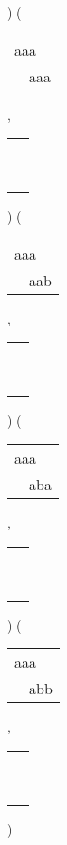 ) 
 ( 
\begin{tabular}{|l|} \hline
aaa\ \  \\
\ \ aaa \\
\hline
\end{tabular} 
 , 
\begin{tabular}{|l|} \hline
\ \\ \ \\ \hline
\end{tabular} 
) 
 ( 
\begin{tabular}{|l|} \hline
aaa\ \  \\
\ \ aab \\
\hline
\end{tabular} 
 , 
\begin{tabular}{|l|} \hline
\ \\ \ \\ \hline
\end{tabular} 
) 
 ( 
\begin{tabular}{|l|} \hline
aaa\ \  \\
\ \ aba \\
\hline
\end{tabular} 
 , 
\begin{tabular}{|l|} \hline
\ \\ \ \\ \hline
\end{tabular} 
) 
 ( 
\begin{tabular}{|l|} \hline
aaa\ \  \\
\ \ abb \\
\hline
\end{tabular} 
 , 
\begin{tabular}{|l|} \hline
\ \\ \ \\ \hline
\end{tabular} 
) 
